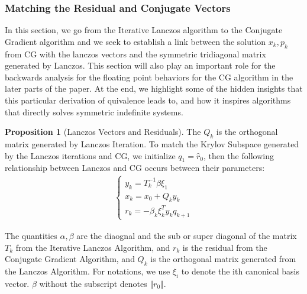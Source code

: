 \documentclass[]{article}
\theoremstyle{definition}
\newtheorem{prop}{Proposition}[section]  %
\begin{document}
        \subsubsection{Matching the Residual and Conjugate Vectors}
            In this section, we go from the Iterative Lanczos algorithm to the Conjugate Gradient algorithm and we seek to establish a link between the solution $x_k, p_k$ from CG with the lanczos vectors and the symmetric tridiagonal matrix generated by Lanczos. This section will also play an important role for the backwards analysis for the floating point behaviors for the CG algorithm in the later parts of the paper. At the end, we highlight some of the hidden insights that this particular derivation of quivalence leads to, and how it inspires algorithms that directly solves symmetric indefinite systems. 
            \begin{prop}[Lanczos Vectors and Residuals]\label{prop:Lanczos_Vectors_and_Residuals}
                The $Q_k$ is the orthogonal matrix generated by Lanczos Iteration. To match the Krylov Subspace generated by the Lanczos iterations and CG, we initialize $q_1 = \hat{r}_0$, then the following relationship between Lanczos and CG occurs between their parameters: 
                \begin{align}
                    \begin{cases}
                        y_k = T^{-1}_k \beta\xi_1
                        \\
                        x_k = x_0 + Q_k y_k
                        \\
                        r_k = -\beta_{k}\xi_k^T y_k q_{k +1}
                    \end{cases}
                \end{align}
            \end{prop}
            The quantities $\alpha, \beta$ are the diaognal and the sub or super diagonal of the matrix $T_k$ from the Iterative Lanczos Algorithm, and $r_k$ is the residual from the Conjugate Gradient Algorithm, and $Q_k$ is the orthogonal matrix generated from the Lanczos Algorithm. For notations, we use $\xi_i$ to denote the ith canonical basis vector. $\beta$  without the subscript denotes $\Vert r_0\Vert$.
\end{document}
